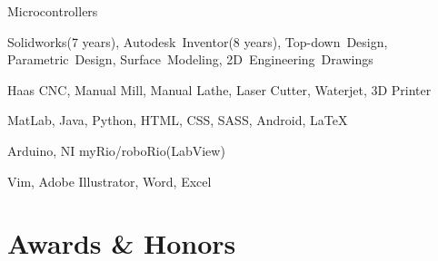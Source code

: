 \documentclass{resume}
\begin{document}
    \begin{skills}{Microcontrollers}

    \item [CAD] Solidworks(7 years), Autodesk~Inventor(8 years), Top-down~Design, Parametric~Design, Surface~Modeling, 2D~Engineering~Drawings
    \item [Manufacturing] Haas CNC, Manual Mill, Manual Lathe, Laser Cutter, Waterjet, 3D Printer
    \item [Programming] MatLab, Java, Python, HTML, CSS, SASS, Android, \LaTeX
    \item [Microcontrollers] Arduino, NI myRio/roboRio(LabView)
    \item [Software] Vim, Adobe Illustrator, Word, Excel
\end{skills}
  \section{Awards \& Honors}
\end{document}
